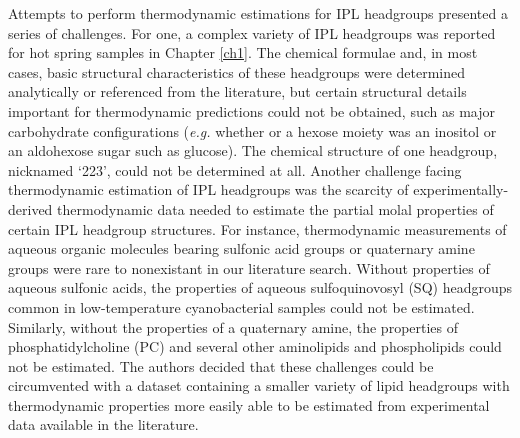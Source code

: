 Attempts to perform thermodynamic estimations for IPL headgroups presented a series of challenges. For one, a complex variety of IPL headgroups was reported for hot spring samples in Chapter \ref{ch1}. The chemical formulae and, in most cases, basic structural characteristics of these headgroups were determined analytically or referenced from the literature, but certain structural details important for thermodynamic predictions could not be obtained, such as major carbohydrate configurations (\textit{e.g.} whether or a hexose moiety was an inositol or an aldohexose sugar such as glucose). The chemical structure of one headgroup, nicknamed `223', could not be determined at all. Another challenge facing thermodynamic estimation of IPL headgroups was the scarcity of experimentally-derived thermodynamic data needed to estimate the partial molal properties of certain IPL headgroup structures. For instance, thermodynamic measurements of aqueous organic molecules bearing sulfonic acid groups or quaternary amine groups were rare to nonexistant in our literature search. Without properties of aqueous sulfonic acids, the properties of aqueous sulfoquinovosyl (SQ) headgroups common in low-temperature cyanobacterial samples could not be estimated. Similarly, without the properties of a quaternary amine, the properties of phosphatidylcholine (PC) and several other aminolipids and phospholipids could not be estimated. The authors decided that these challenges could be circumvented with a dataset containing a smaller variety of lipid headgroups with thermodynamic properties more easily able to be estimated from experimental data available in the literature.


